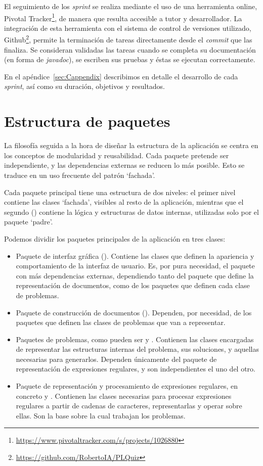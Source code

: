 El seguimiento de los \emph{sprint} se realiza mediante el uso de una herramienta online, Pivotal Tracker\footnote{\url{https://www.pivotaltracker.com/s/projects/1026880}}, de manera que resulta accesible a tutor y desarrollador.
La integración de esta herramienta con el sistema de control de versiones utilizado, Github\footnote{\url{https://github.com/RobertoIA/PLQuiz}}, permite la terminación de tareas directamente desde el \emph{commit} que las finaliza.
Se consideran validadas las tareas cuando se completa su documentación (en forma de \emph{javadoc}), se escriben sus pruebas y éstas se ejecutan correctamente.

En el apéndice~\ref{sec:Cappendix} describimos en detalle el desarrollo de cada \emph{sprint}, así como su duración, objetivos y resultados.

\section{Estructura de paquetes}
La filosofía seguida a la hora de diseñar la estructura de la aplicación se centra en los conceptos de modularidad y reusabilidad.
Cada paquete pretende ser independiente, y las dependencias externas se reducen lo más posible.
Esto se traduce en un uso frecuente del patrón `fachada'.

Cada paquete principal tiene una estructura de dos niveles: el primer nivel contiene las clases `fachada', visibles al resto de la aplicación, mientras que el segundo () contiene la lógica y estructuras de datos internas, utilizadas solo por el paquete `padre'.

Podemos dividir los paquetes principales de la aplicación en tres clases:
\begin{itemize}
	\item Paquete de interfaz gráfica ().
	Contiene las clases que definen la apariencia y comportamiento de la interfaz de usuario.
	Es, por pura necesidad, el paquete con más dependencias externas, dependiendo tanto del paquete que define la representación de documentos, como de los paquetes que definen cada clase de problemas.
	\item Paquete de construcción de documentos ().
	Dependen, por necesidad, de los paquetes que definen las clases de problemas que van a representar.
	\item Paquetes de problemas, como pueden ser  y .
	Contienen las clases encargadas de representar las estructuras internas del problema, sus soluciones, y aquellas necesarias para generarlos.
	Dependen únicamente del paquete de representación de expresiones regulares, y son independientes el uno del otro.
	\item Paquete de representación y procesamiento de expresiones regulares, en concreto  y .
	Contienen las clases necesarias para procesar expresiones regulares a partir de cadenas de caracteres, representarlas y operar sobre ellas.
	Son la base sobre la cual trabajan los problemas.
\end{itemize}


